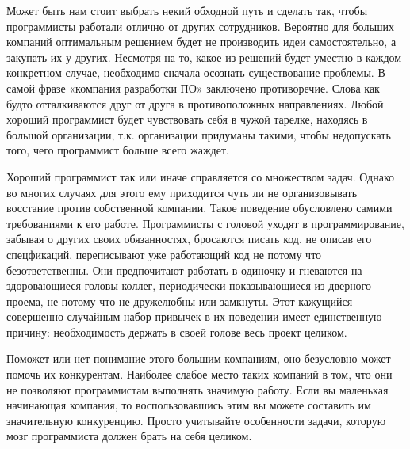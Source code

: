 \documentclass[ebook,12pt,oneside,openany]{memoir}
\begin{document}
Может быть нам стоит выбрать некий обходной путь и сделать так, чтобы
программисты работали отлично от других сотрудников. Вероятно для
больших компаний оптимальным решением будет не производить идеи
самостоятельно, а закупать их у других. Несмотря на то, какое из
решений будет уместно в каждом конкретном случае, необходимо сначала
осознать существование проблемы. В самой фразе «компания разработки
ПО» заключено противоречие. Слова как будто отталкиваются друг от
друга в противоположных направлениях. Любой хороший программист будет
чувствовать себя в чужой тарелке, находясь в большой организации, т.к.
организации придуманы такими, чтобы недопускать того, чего программист
больше всего жаждет.

Хороший программист так или иначе справляется со множеством задач.
Однако во многих случаях для этого ему приходится чуть ли не
организовывать восстание против собственной компании. Такое поведение
обусловлено самими требованиями к его работе. Программисты с головой
уходят в программирование, забывая о других своих обязанностях,
бросаются писать код, не описав его спецфикаций, переписывают уже
работающий код не потому что безответственны. Они предпочитают
работать в одиночку и гневаются на здоровающиеся головы коллег,
периодически показывающиеся из дверного проема, не потому что не
дружелюбны или замкнуты. Этот кажущийся совершенно случайным набор
привычек в их поведении имеет единственную причину: необходимость
держать в своей голове весь проект целиком.

Поможет или нет понимание этого большим компаниям, оно безусловно
может помочь их конкурентам. Наиболее слабое место таких компаний в
том, что они не позволяют программистам выполнять значимую работу.
Если вы маленькая начинающая компания, то воспользовавшись этим вы
можете составить им значительную конкуренцию. Просто учитывайте
особенности задачи, которую мозг программиста должен брать на себя
целиком.
\end{document}
